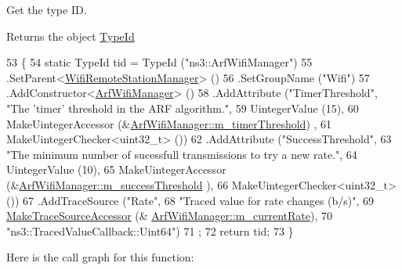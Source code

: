 Get the type ID. 

\begin{DoxyReturn}{Returns}
the object \hyperlink{classns3_1_1TypeId}{Type\+Id} 
\end{DoxyReturn}

\begin{DoxyCode}
53 \{
54   \textcolor{keyword}{static} TypeId tid = TypeId (\textcolor{stringliteral}{"ns3::ArfWifiManager"})
55     .SetParent<\hyperlink{classns3_1_1WifiRemoteStationManager_a78524840f5900e1937e8e2d6df48954d}{WifiRemoteStationManager}> ()
56     .SetGroupName (\textcolor{stringliteral}{"Wifi"})
57     .AddConstructor<\hyperlink{classns3_1_1ArfWifiManager_a458122abd9d00849a123388c4efd01e8}{ArfWifiManager}> ()
58     .AddAttribute (\textcolor{stringliteral}{"TimerThreshold"}, \textcolor{stringliteral}{"The 'timer' threshold in the ARF algorithm."},
59                    UintegerValue (15),
60                    MakeUintegerAccessor (&\hyperlink{classns3_1_1ArfWifiManager_ab5925d5bdf91969c526dc9dd00dc0856}{ArfWifiManager::m\_timerThreshold})
      ,
61                    MakeUintegerChecker<uint32\_t> ())
62     .AddAttribute (\textcolor{stringliteral}{"SuccessThreshold"},
63                    \textcolor{stringliteral}{"The minimum number of sucessfull transmissions to try a new rate."},
64                    UintegerValue (10),
65                    MakeUintegerAccessor (&\hyperlink{classns3_1_1ArfWifiManager_a6ec0b16b55aa4c35686b4ab5bd61240d}{ArfWifiManager::m\_successThreshold}
      ),
66                    MakeUintegerChecker<uint32\_t> ())
67     .AddTraceSource (\textcolor{stringliteral}{"Rate"},
68                      \textcolor{stringliteral}{"Traced value for rate changes (b/s)"},
69                      \hyperlink{group__tracing_gab21a770b9855af4e8f69f7531ea4a6b0}{MakeTraceSourceAccessor} (&
      \hyperlink{classns3_1_1ArfWifiManager_afda32f9ba0ac3498046851561ae7ed30}{ArfWifiManager::m\_currentRate}),
70                      \textcolor{stringliteral}{"ns3::TracedValueCallback::Uint64"})
71   ;
72   \textcolor{keywordflow}{return} tid;
73 \}
\end{DoxyCode}


Here is the call graph for this function\+:


